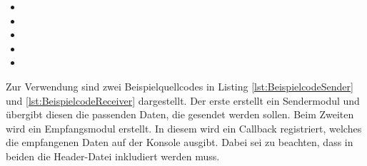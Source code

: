 \begin{itemize}
\item {} 
\item {}
\item {}
\item {}
\item {}
\end{itemize}

Zur Verwendung sind zwei Beispielquellcodes in Listing
\ref{lst:BeispielcodeSender} und \ref{lst:BeispielcodeReceiver} dargestellt. Der
erste erstellt ein Sendermodul und übergibt diesen die passenden Daten, die
gesendet werden sollen. Beim Zweiten wird ein Empfangsmodul erstellt. In diesem
wird ein Callback registriert, welches die empfangenen Daten auf der Konsole
ausgibt. Dabei sei zu beachten, dass in beiden die Header-Datei 
inkludiert werden muss.

\newpage

\lstset{language=C++}



\lstset{language=C++}

